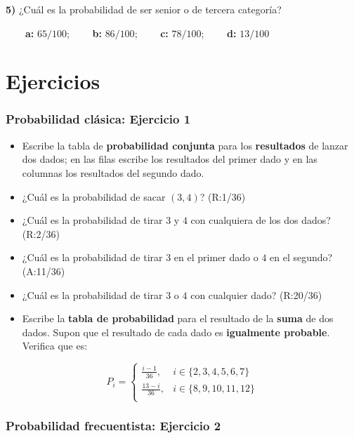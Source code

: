 \documentclass[
]{book}
\begin{document}
\textbf{5)} ¿Cuál es la probabilidad de ser senior o de tercera categoría?

\textbf{\(\qquad\)a:} \(65/100\); \textbf{\(\qquad\)b:} \(86/100\); \textbf{\(\qquad\)c:} \(78/100\); \textbf{\(\qquad\)d:} \(13/100\)

\hypertarget{ejercicios-1}{%
\section{Ejercicios}\label{ejercicios-1}}

\hypertarget{probabilidad-cluxe1sica-ejercicio-1}{%
\subsubsection{Probabilidad clásica: Ejercicio 1}\label{probabilidad-cluxe1sica-ejercicio-1}}

\begin{itemize}
\item
  Escribe la tabla de \textbf{probabilidad conjunta} para los \textbf{resultados} de lanzar dos dados; en las filas escribe los resultados del primer dado y en las columnas los resultados del segundo dado.
\item
  ¿Cuál es la probabilidad de sacar \((3,4)\)? (R:1/36)
\item
  ¿Cuál es la probabilidad de tirar \(3\) y \(4\) con cualquiera de los dos dados? (R:2/36)
\item
  ¿Cuál es la probabilidad de tirar \(3\) en el primer dado o \(4\) en el segundo? (A:11/36)
\item
  ¿Cuál es la probabilidad de tirar \(3\) o \(4\) con cualquier dado? (R:20/36)
\item
  Escribe la \textbf{tabla de probabilidad} para el resultado de la \textbf{suma} de dos dados. Supon que el resultado de cada dado es \textbf{igualmente probable}. Verifica que es:
\end{itemize}

\[
    P_i= 
\begin{cases}
   \frac{i-1}{36},& i \in \{2,3,4,5,6, 7\} \\
\frac{13-i}{36},& i \in \{8,9,10,11,12\} \\ 
\end{cases}
\]

\hypertarget{probabilidad-frecuentista-ejercicio-2}{%
\subsubsection{Probabilidad frecuentista: Ejercicio 2}\label{probabilidad-frecuentista-ejercicio-2}}
\end{document}
